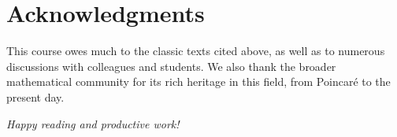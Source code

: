 \section*{Acknowledgments}

This course owes much to the classic texts cited above, as well as to
numerous discussions with colleagues and students. We also thank the broader
mathematical community for its rich heritage in this field, from Poincar\'e
to the present day.

\vfill
\begin{flushright}
\textit{Happy reading and productive work!}
\end{flushright}
